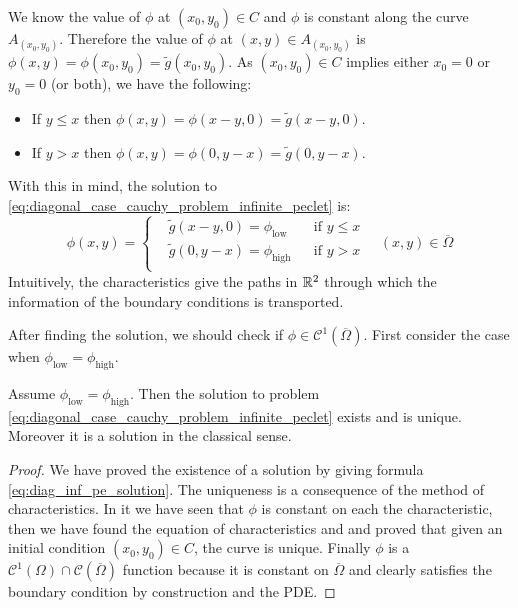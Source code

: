 We know the value of $\phi$ at $(x_0,y_0) \in C$ and $\phi$ is constant along
the curve $A_{(x_0,y_0)}$. Therefore the value of $\phi$ at $(x,y) \in
A_{(x_0,y_0)}$ is $\phi(x,y) = \phi(x_0,y_0) = \tilde{g}(x_0,y_0)$. As
$(x_0,y_0) \in C$ implies either $x_0 = 0$ or $y_0 = 0$ (or both), we have the following:
\begin{itemize}[topsep=0pt]
	\item If $y \leq x$ then $\phi(x,y) = \phi(x-y,0) = \tilde{g}(x-y,0)$.
	\item If $y > x$ then $\phi(x,y) = \phi(0,y-x) = \tilde{g}(0,y-x)$.
\end{itemize}
With this in mind, the solution to \eqref{eq:diagonal_case_cauchy_problem_infinite_peclet} is:
\begin{equation} \label{eq:diag_inf_pe_solution}
	\phi(x,y) = 
	\left\{
		\begin{aligned}
			&\tilde{g}(x-y,0) = \phi_\text{low} & &\text{if } y \leq x \\
			&\tilde{g}(0,y-x) = \phi_\text{high} & &\text{if } y > x \\
		\end{aligned}
	\right.
	\quad
	(x,y) \in \overline{\Omega}
\end{equation}
Intuitively, the characteristics give the paths in $\mathbb{R}^2$ through which the
information of the boundary conditions is transported. 

After finding the solution, we should check if $\phi \in
\mathcal{C}^1(\overline{\Omega})$. First consider the case when $\phi_\text{low}
= \phi_\text{high}$.

\begin{theorem}
	Assume $\phi_\text{low} = \phi_\text{high}$. Then the solution to problem
	\eqref{eq:diagonal_case_cauchy_problem_infinite_peclet} exists and is
	unique. Moreover it is a solution in the classical sense.
\end{theorem}
\begin{proof}
	We have proved the existence of a solution by giving formula
	\eqref{eq:diag_inf_pe_solution}. The uniqueness is a consequence of the
	method of characteristics. In it we have seen that $\phi$ is constant on
	each the characteristic, then we have found the equation of characteristics
	and and proved that given an initial condition $(x_0,y_0) \in C$, the curve
	is unique. Finally $\phi$ is a $\mathcal{C}^1(\Omega) \cap
	\mathcal{C}(\overline{\Omega})$ function because it is constant on
	$\overline{\Omega}$ and clearly satisfies the boundary condition by
	construction and the PDE.
\end{proof}

